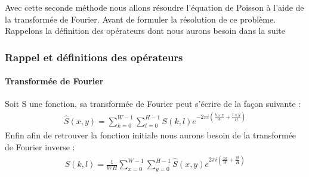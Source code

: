 Avec cette seconde méthode nous allons résoudre l'équation de Poisson à l'aide de la transformée de Fourier. Avant de formuler la résolution de ce problème. Rappelons la définition des opérateurs dont nous aurons besoin dans la suite
\subsubsection{Rappel et définitions des opérateurs}
\paragraph{Transformée de Fourier}
Soit S une fonction, sa transformée de Fourier peut s'écrire de la façon suivante : 
\begin{equation}
\begin{aligned}
\widehat{S}(x,y) = \sum_{k = 0}^{W-1} \sum_{l = 0}^{H-1} S(k,l) e^{-2\pi i\left(\frac{k\times x}{W}+\frac{l\times y}{H}\right)}
\end{aligned}
\end{equation}
Enfin afin de retrouver la fonction initiale nous aurons besoin de la transformée de Fourier inverse : 
\begin{equation}
\begin{aligned}
S(k,l) = \frac{1}{WH} \sum_{x = 0}^{W-1} \sum_{y = 0}^{H-1} \hat{S}(x,y) e^{2\pi i \left(\frac{xk}{W}+\frac{yl}{H}\right)}
\end{aligned}
\end{equation}
